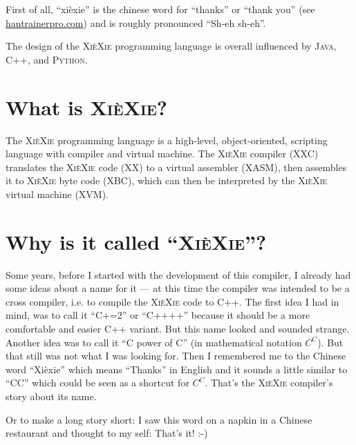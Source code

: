 \documentclass{report}
\def\xiexie{\textsc{Xi\`eXie}\xspace}
\def\xxlang{\xiexie programming language\xspace}
\def\cpp{\textsc{C++}\xspace}
\def\java{\textsc{Java}\xspace}
\def\python{\textsc{Python}\xspace}
\begin{document}
First of all, ``xi\`exie'' is the chinese word for ``thanks'' or ``thank you''
(see \href{http://dictionary.hantrainerpro.com/chinese-english/translation-xiexie_thankyou.htm}{hantrainerpro.com})
and is roughly pronounced ``Sh-eh sh-eh''.

The design of the \xxlang is overall influenced by \java, \cpp, and \python.



\section{What is \xiexie?}

The \xiexie programming language is a high-level, object-oriented, scripting language with compiler and virtual machine.
The \xiexie compiler (XXC) translates the \xiexie code (XX) to a virtual assembler (XASM), then assembles it to
\xiexie byte code (XBC), which can then be interpreted by the \xiexie virtual machine (XVM).



\section{Why is it called ``\xiexie''?}

Some years, before I started with the development of this compiler, I already had some ideas about a name for it
--- at this time the compiler was intended to be a cross compiler, i.e. to compile the \xiexie code to \cpp.
The first idea I had in mind, was to call it ``C+=2'' or ``C++++'' because it should be a more comfortable and easier
\cpp variant. But this name looked and sounded strange. Another idea was to call it ``C power of C''
(in mathematical notation $C^C$). But that still was not what I was looking for.
Then I remembered me to the Chinese word ``Xi\`exie'' which means ``Thanks'' in English and it sounds a little
similar to ``CC'' which could be seen as a shortcut for $C^C$. That's the \xiexie compiler's story about its name.

Or to make a long story short: I saw this word on a napkin in a Chinese restaurant and thought to my self: That's it! :-)
\end{document}
